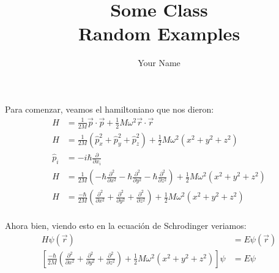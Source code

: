 \documentclass{report}
\title{\Huge{Some Class}\\Random Examples}
\author{\huge{Your Name}}
\date{}
\begin{document}
\maketitle
\newpage%
\tableofcontents
\pagebreak

\chapter{}

\chapter{}

\chapter{}

Para comenzar, veamos el hamiltoniano que nos dieron:
\begin{align*}
  H &= \frac{1}{2M}\vec{p}\cdot\vec{p} + \frac{1}{2}M\omega^2 \vec{r}\cdot\vec{r}\\
  H &= \frac{1}{2M}\left( \hat{p}_x^2 + \hat{p}_y^2 + \hat{p}_z^2 \right) + \frac{1}{2}M\omega^2 \left(x^2 + y^2 + z^2\right)\\
  \hat{p}_i &= - i\hbar \frac{\partial}{\partial x_i}\\
  H &= \frac{1}{2M}\left(  - \hbar \frac{\partial^2}{\partial x^2} - \hbar \frac{\partial^2}{\partial y^2} - \hbar \frac{\partial^2}{\partial z^2}\right) + \frac{1}{2}M\omega^2 \left(x^2 + y^2 + z^2\right)\\
  H &= \frac{-\hbar}{2M}\left(  \frac{\partial^2}{\partial x^2} + \frac{\partial^2}{\partial y^2} + \frac{\partial^2}{\partial z^2}\right) + \frac{1}{2}M\omega^2 \left(x^2 + y^2 + z^2\right)\\
\end{align*}

Ahora bien, viendo esto en la ecuación de Schrodinger veriamos:
\begin{align*}
  H\psi(\vec{r}) &= E\psi(\vec{r})\\
  \left[\frac{-\hbar}{2M}\left(  \frac{\partial^2}{\partial x^2} + \frac{\partial^2}{\partial y^2} + \frac{\partial^2}{\partial z^2}\right) + \frac{1}{2}M\omega^2 \left(x^2 + y^2 + z^2\right)\right]\psi &= E\psi
\end{align*}
\end{document}
